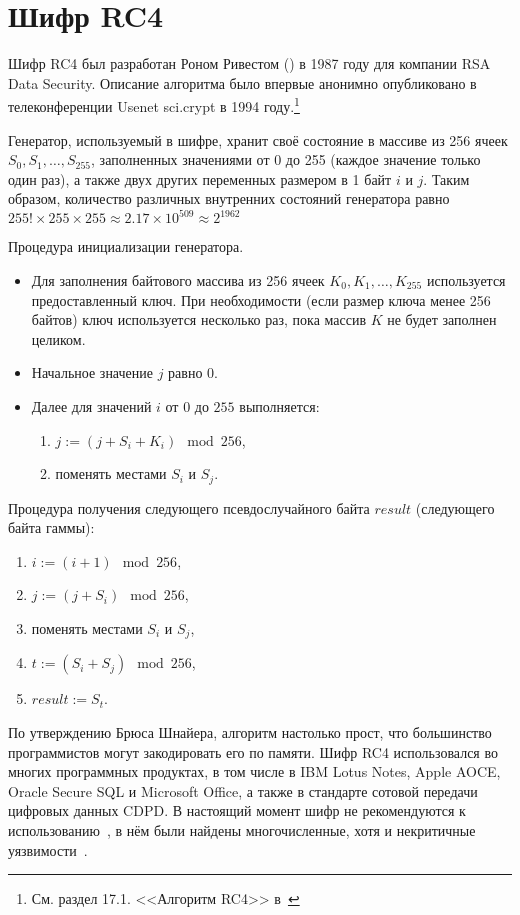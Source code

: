 \section{Шифр RC4}\label{rc4}

Шифр RC4 был разработан Роном Ривестом () в 1987 году для компании RSA Data Security. Описание алгоритма было впервые анонимно опубликовано в телеконференции Usenet sci.crypt в 1994 году.\footnote{См. раздел 17.1. <<Алгоритм RC4>> в~\cite{Schneier:2002}}

Генератор, используемый в шифре, хранит своё состояние в массиве из 256 ячеек $S_0, S_1, \dots, S_{255}$, заполненных значениями от 0 до 255 (каждое значение только один раз), а также двух других переменных размером в 1 байт $i$ и $j$. Таким образом, количество различных внутренних состояний генератора равно $255! \times 255 \times 255 \approx 2.17 \times 10^{509} \approx 2^{1962}$

Процедура инициализации генератора.
\begin{itemize}
	\item Для заполнения байтового массива из 256 ячеек $K_0, K_1, \dots, K_{255}$ используется предоставленный ключ. При необходимости (если размер ключа менее 256 байтов) ключ используется несколько раз, пока массив $K$ не будет заполнен целиком.
	\item Начальное значение $j$ равно $0$.
	\item Далее для значений $i$ от $0$ до $255$ выполняется:
	\begin{enumerate}
		\item $j:= (j + S_i + K_i) \mod 256$,
		\item поменять местами $S_i$ и $S_j$.
	\end{enumerate}
\end{itemize}

Процедура получения следующего псевдослучайного байта $result$ (следующего байта гаммы):
\begin{enumerate}
	\item $ i := (i + 1) \mod 256$,
	\item $ j := (j + S_i) \mod 256$,
	\item поменять местами $S_i$ и $S_j$,
	\item $ t := ( S_i + S_j ) \mod 256$,
	\item $ result := S_t$.
\end{enumerate}

По утверждению Брюса Шнайера, алгоритм настолько прост, что большинство программистов могут закодировать его по памяти. Шифр RC4 использовался во многих программных продуктах, в том числе в IBM Lotus Notes, Apple AOCE, Oracle Secure SQL и Microsoft Office, а также в стандарте сотовой передачи цифровых данных CDPD. В настоящий момент шифр не рекомендуются к использованию~\cite{rfc7465}, в нём были найдены многочисленные, хотя и некритичные уязвимости~\cite{Fluhrer:Mantin:Shamir:2001,Mantin:Shamir:2002,Paul:Maitra:2007,Sepehrdad:Vaudenay:Vuagnoux:2011}.

